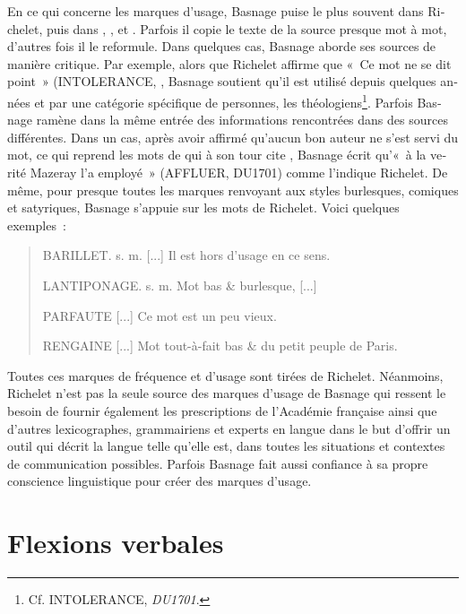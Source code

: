 \documentclass[output=paper,colorlinks,citecolor=brown,arabicfont,chinesefont,booklanguage=french]{langscibook}
\begin{document}
\begin{otherlanguage}{french}
En ce qui concerne les marques d’usage, Basnage puise le plus souvent dans Richelet, puis dans \citet{Pomey1664}, \citet{Menage1672}, \citet{La_touche1696} et \citet{Corneille1694}. Parfois il copie le texte de la source presque mot à mot, d'autres fois il le reformule. Dans quelques cas, Basnage aborde ses sources de manière critique. Par exemple, alors que Richelet affirme que «~Ce mot ne se dit point~» (INTOLERANCE, \citet{Richelet1693}, Basnage soutient qu'il est utilisé depuis quelques années et par une catégorie spécifique de personnes, les théologiens\footnote{Cf. INTOLERANCE, \emph{DU1701}.}. Parfois Basnage ramène dans la même entrée des informations rencontrées dans des sources différentes. Dans un cas, après avoir affirmé qu’aucun bon auteur ne s’est servi du mot, ce qui reprend les mots de \citet{La_touche1696} qui à son tour cite \citet{Boisregard1689}, Basnage écrit qu’«~à la verité Mazeray l’a employé~» (AFFLUER, DU1701) comme l’indique Richelet. De même, pour presque toutes les marques renvoyant aux styles burlesques, comiques et satyriques, Basnage s’appuie sur les mots de Richelet. Voici quelques exemples~:

\begin{quote}
    BARILLET. s. m. [...] Il est hors d'usage en ce sens. 
    
    LANTIPONAGE. s. m. Mot bas \& burlesque, [...]

    PARFAUTE [...] Ce mot est un peu vieux.

    RENGAINE [...] Mot tout-à-fait bas \& du petit peuple de Paris. 

\end{quote}

Toutes ces marques de fréquence et d’usage sont tirées de Richelet. Néanmoins, Richelet n’est pas la seule source des marques d’usage de Basnage qui ressent le besoin de fournir également les prescriptions de l'Académie française ainsi que d’autres lexicographes, grammairiens et experts en langue dans le but d’offrir un outil qui décrit la langue telle qu'elle est, dans toutes les situations et contextes de communication possibles. Parfois Basnage fait aussi confiance à sa propre conscience linguistique pour créer des marques d'usage. 

\section{Flexions verbales}


\end{otherlanguage}
\end{document}
